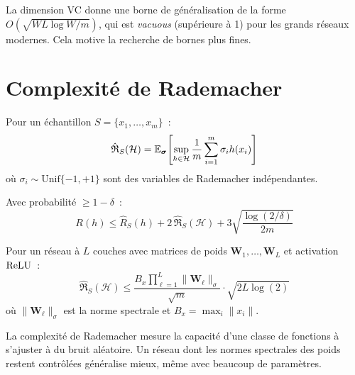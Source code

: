 \begin{attention}
La dimension VC donne une borne de g\'en\'eralisation de la forme
$O\!\left(\sqrt{WL\log W / m}\right)$, qui est \emph{vacuous} (sup\'erieure
\`a 1) pour les grands r\'eseaux modernes. Cela motive la recherche de
bornes plus fines.
\end{attention}

\section{Complexit\'e de Rademacher}
\label{sec:rademacher}

\begin{definition}
\label{def:rademacher}
Pour un \'echantillon $S = \{x_1, \ldots, x_m\}$~:
\begin{equation}
\hat{\mathfrak{R}}_S(\mathcal{H}) = \mathbb{E}_{\boldsymbol{\sigma}}\!\left[\sup_{h \in \mathcal{H}} \frac{1}{m}\sum_{i=1}^{m} \sigma_i h(x_i)\right]
\end{equation}
o\`u $\sigma_i \sim \text{Unif}\{-1, +1\}$ sont des variables de Rademacher
ind\'ependantes.
\end{definition}

\begin{theoreme}
\label{thm:rademacher-bound}
Avec probabilit\'e $\geq 1 - \delta$~:
\begin{equation}
R(h) \leq \hat{R}_S(h) + 2\,\hat{\mathfrak{R}}_S(\mathcal{H}) + 3\sqrt{\frac{\log(2/\delta)}{2m}}
\end{equation}
\end{theoreme}

\begin{proposition}
\label{prop:spectral-rademacher}
Pour un r\'eseau \`a $L$ couches avec matrices de poids $\mathbf{W}_1, \ldots, \mathbf{W}_L$
et activation $\mathrm{ReLU}$~:
\begin{equation}
\hat{\mathfrak{R}}_S(\mathcal{H}) \leq \frac{B_x \prod_{\ell=1}^{L} \|\mathbf{W}_\ell\|_{\sigma}}{\sqrt{m}} \cdot \sqrt{2L\log(2)}
\end{equation}
o\`u $\|\mathbf{W}_\ell\|_{\sigma}$ est la norme spectrale et
$B_x = \max_i \|x_i\|$.
\end{proposition}

\begin{intuition}
La complexit\'e de Rademacher mesure la capacit\'e d'une classe de fonctions
\`a s'ajuster \`a du bruit al\'eatoire. Un r\'eseau dont les normes spectrales
des poids restent contr\^ol\'ees g\'en\'eralise mieux, m\^eme avec beaucoup
de param\`etres.
\end{intuition}

